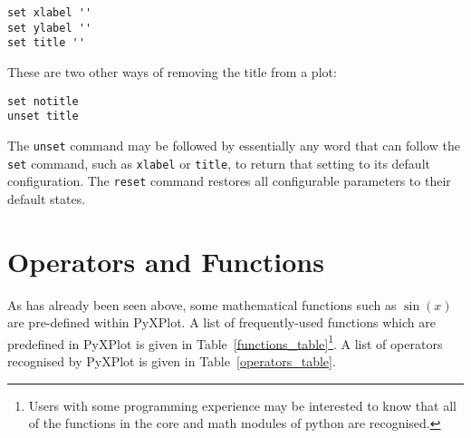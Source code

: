 \documentclass[a4paper,onecolumn,11pt]{book}
\begin{document}
\begin{verbatim}
set xlabel ''
set ylabel ''
set title ''
\end{verbatim}

\noindent These are two other ways of removing the title from a plot:

\begin{verbatim}
set notitle
unset title
\end{verbatim}

The \texttt{unset} command may be
followed by essentially any word that can follow the \texttt{set} command, such
as \texttt{xlabel} or \texttt{title}, to return that setting to its default
configuration. The \texttt{reset} command restores all configurable parameters to their default states.

\section{Operators and Functions}

As has already been seen above, some mathematical functions such as $\sin(x)$ are
pre-defined within PyXPlot. A list of frequently-used functions which are
predefined in PyXPlot is given in Table~\ref{functions_table}\footnote{Users
with some programming experience may be interested to know that all of the
functions in the core and math modules of python are recognised.}. A list of
operators recognised by PyXPlot is given in Table~\ref{operators_table}.
\end{document}
